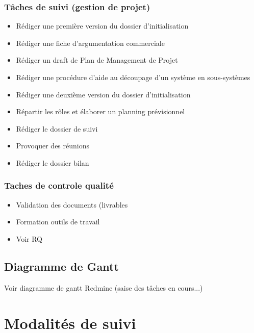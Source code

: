 \begin{itemize}
    \end{itemize}
    
\subsubsection {Tâches de suivi (gestion de projet)}
	\begin{itemize}		
		\item Rédiger une première version du dossier d'initialisation
		\item Rédiger une fiche d'argumentation commerciale
		\item Rédiger un draft de Plan de Management de Projet
		\item Rédiger une procédure d'aide au découpage d'un système en sous-systèmes
		\item Rédiger une deuxième version du dossier d'initialisation	
		\item Répartir les rôles et élaborer un planning prévisionnel		
		\item Rédiger le dossier de suivi
		\item Provoquer des réunions
		\item Rédiger le dossier bilan
	
	\end{itemize}
	
\subsubsection {Taches de controle qualité}
\begin{itemize}
    \item Validation des documents (livrables
	\item Formation outils de travail
	\item Voir RQ 
\end{itemize}	

\subsection{Diagramme de Gantt}
Voir diagramme de gantt Redmine (saise des tâches en cours...)
\section{Modalités de suivi}
